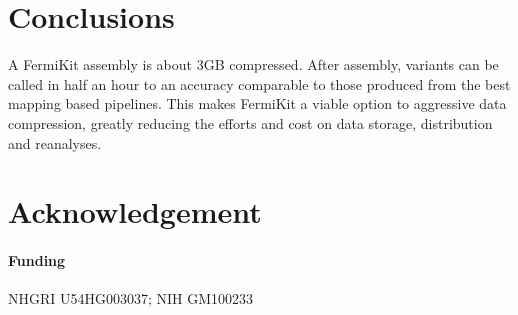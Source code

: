 \documentclass{bioinfo}
\begin{document}
\section{Conclusions}

A FermiKit assembly is about 3GB compressed. After assembly, variants can be
called in half an hour to an accuracy comparable to those produced from the
best mapping based pipelines. This makes FermiKit a viable option to aggressive
data compression, greatly reducing the efforts and cost on data storage,
distribution and reanalyses.

\section*{Acknowledgement}
\paragraph{Funding\textcolon} NHGRI U54HG003037; NIH GM100233


\end{document}
